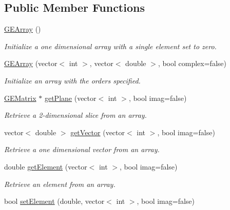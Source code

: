 \subsection*{Public Member Functions}
\begin{DoxyCompactItemize}
\item 
\hypertarget{class_g_e_array_a59934816e881cf01fb22d08f1d8fc1e0}{\hyperlink{class_g_e_array_a59934816e881cf01fb22d08f1d8fc1e0}{G\-E\-Array} ()}\label{class_g_e_array_a59934816e881cf01fb22d08f1d8fc1e0}

\begin{DoxyCompactList}\small\item\em Initialize a one dimensional array with a single element set to zero. \end{DoxyCompactList}\item 
\hyperlink{class_g_e_array_a51213e054718836f9bea482c3d2e01fc}{G\-E\-Array} (vector$<$ int $>$, vector$<$ double $>$, bool complex=false)
\begin{DoxyCompactList}\small\item\em Initialize an array with the orders specified. \end{DoxyCompactList}\item 
\hyperlink{class_g_e_matrix}{G\-E\-Matrix} $\ast$ \hyperlink{class_g_e_array_aef823665c01857bc134d70b5a8a9f18c}{get\-Plane} (vector$<$ int $>$, bool imag=false)
\begin{DoxyCompactList}\small\item\em Retrieve a 2-\/dimensional slice from an array. \end{DoxyCompactList}\item 
vector$<$ double $>$ \hyperlink{class_g_e_array_ae77d4eb43d45ebaa8ac81d0ec16bbb5b}{get\-Vector} (vector$<$ int $>$, bool imag=false)
\begin{DoxyCompactList}\small\item\em Retrieve a one dimensional vector from an array. \end{DoxyCompactList}\item 
double \hyperlink{class_g_e_array_a1430d1c4f30b9f147cd1dfd574bb0965}{get\-Element} (vector$<$ int $>$, bool imag=false)
\begin{DoxyCompactList}\small\item\em Retrieve an element from an array. \end{DoxyCompactList}\item 
bool \hyperlink{class_g_e_array_ad35d973752916a501182c16540b0fb27}{set\-Element} (double, vector$<$ int $>$, bool imag=false)

\end{DoxyCompactItemize}
